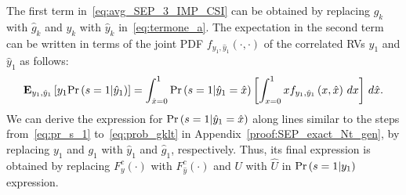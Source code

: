 \documentclass[12pt,draftcls,peerreview,onecolumn]{IEEEtran}
\newcommand{\brac}[1]{\left({#1}\right)}
\newcommand{\explow}[2]{{\bf{E}}_{#1}\left[{#2}\right]}
\newcommand{\prob}[1]{\text{Pr}\brac{#1}}
\newcommand{\given}{\arrowvert}
\newcommand{\puch}{g}
\newcommand{\gk}[1]{{\puch_{#1}}}
\newcommand{\yk}[1]{y_{#1}}
\newcommand{\un}{U}
\newcommand{\unhat}{\widehat{\un}}
\newcommand{\ghat}{\hat{\puch}}
\newcommand{\yhat}{\hat{y}}
\newcommand{\gkhat}[1]{\ghat_{#1}}
\newcommand{\ykhat}[1]{\hat{y}_{#1}}
\newcommand{\ccdfyrv}[1]{ F^{c}_{y}\left(#1 \right) }
\newcommand{\ccdfyhatrv}[1]{F^{c}_{\yhat}\left(#1 \right) }
\newcommand{\xhat}{\hat{x}}
\begin{document}
The first term in~\eqref{eq:avg_SEP_3_IMP_CSI} can be obtained by replacing $\gk{k}$ with $\gkhat{k}$ and $\yk{k}$ with $\ykhat{k}$ in~\eqref{eq:termone_a}. The expectation in the second term can be written in terms of the joint PDF $f_{\yk{1},\ykhat{1}}\left(\cdot,\cdot\right)$ of the correlated RVs $\yk{1}$ and $\ykhat{1}$ as follows:
%
\begin{equation}
\label{eq:avg_SEP_4_IMP_CSI}
\explow{\yk{1},\ykhat{1}}{\yk{1}\prob{s=1\given \ykhat{1}}}= \int_{\xhat=0}^{1} \prob{s=1\given \ykhat{1}=\xhat} \left[ \int_{x=0}^{1} x  f_{\yk{1},\ykhat{1}}\left(x,\xhat\right)\,dx\right] \,d\xhat.
\end{equation}
%
We can derive the expression for $\prob{s=1\given\ykhat{1}=\xhat}$ along lines similar to the steps from~\eqref{eq:pr_s_1} to~\eqref{eq:prob_gklt} in Appendix~\ref{proof:SEP_exact_Nt_gen},  by replacing $\yk{1}$ and $\gk{1}$ with $\ykhat{1}$ and $\gkhat{1}$, respectively. Thus, its final expression is obtained by replacing $\ccdfyrv{\cdot}$ with $\ccdfyhatrv{\cdot}$ and $\un$  with $\unhat$ in $\prob{s=1\given\yk{1}}$ expression. 
\end{document}

